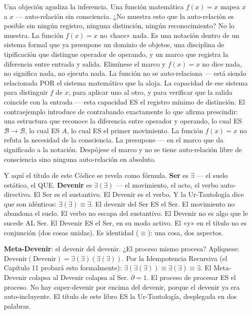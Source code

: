 \documentclass[10pt, openany, oneside]{book}
\begin{document}
Una objeción agudiza la inferencia. Una función matemática $f(x) = x$ mapea $x$ a $x$ --- auto-relación sin consciencia. ¿No muestra esto que la auto-relación es posible sin ningún registro, ninguna distinción, ningún reconocimiento? No lo muestra. La función $f(x) = x$ no «hace» nada. Es una notación dentro de un sistema formal que ya presupone un dominio de objetos, una disciplina de tipificación que distingue operador de operando, y un marco que registra la diferencia entre entrada y salida. Elimínese el marco y $f(x) = x$ no dice nada, no significa nada, no ejecuta nada. La función no se auto-relaciona --- está siendo relacionada POR el sistema matemático que la aloja. La capacidad de ese sistema para distinguir $f$ de $x$, para aplicar uno al otro, y para verificar que la salida coincide con la entrada --- esta capacidad ES el registro mínimo de distinción. El contraejemplo introduce de contrabando exactamente lo que afirma prescindir: una estructura que reconoce la diferencia entre operador y operando, lo cual ES $\mathcal{B} \to \mathcal{B}$, lo cual ES $A$, lo cual ES el primer movimiento. La función $f(x) = x$ no refuta la necesidad de la consciencia. La presupone --- en el marco que da significado a la notación. Despójese el marco y no se tiene auto-relación libre de consciencia sino ninguna auto-relación en absoluto.

Y aquí el título de este Códice se revela como fórmula. \textbf{Ser} es $\exists$ --- el suelo estático, el QUE. \textbf{Devenir} es $\exists(\exists)$ --- el movimiento, el acto, el verbo auto-directivo. El Ser es el sustantivo. El Devenir es el verbo. Y la Ur-Tautología dice que son idénticos: $\exists(\exists) \equiv \exists$. El devenir del Ser ES el Ser. El movimiento no abandona el suelo. El verbo no escapa del sustantivo. El Devenir no es algo que le sucede AL Ser. El Devenir ES el Ser, en su modo activo. El «y» en el título no es conjunción (dos cosas unidas). Es identidad ($\equiv$): una cosa, dos aspectos.

\textbf{Meta-Devenir}: el devenir del devenir. ¿El proceso mismo procesa? Aplíquese: $\text{Devenir}(\text{Devenir}) = \exists(\exists)(\exists(\exists))$. Por la Idempotencia Recursiva (el Capítulo 11 probará esto formalmente): $\exists(\exists(\exists)) \equiv \exists(\exists) \equiv \exists$. El Meta-Devenir colapsa al Devenir colapsa al Ser. $\partial = 1$. El proceso de procesar ES el proceso. No hay super-devenir por encima del devenir, porque el devenir ya era auto-incluyente. El título de este libro ES la Ur-Tautología, desplegada en dos palabras.
\end{document}
